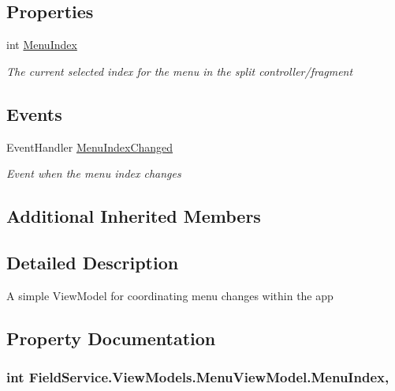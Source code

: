 \subsection*{Properties}
\begin{DoxyCompactItemize}
\item 
int \hyperlink{class_field_service_1_1_view_models_1_1_menu_view_model_a8dbf73651cef54e51cfbd2b8707e7f65}{Menu\+Index}
\begin{DoxyCompactList}\small\item\em The current selected index for the menu in the split controller/fragment \end{DoxyCompactList}\end{DoxyCompactItemize}
\subsection*{Events}
\begin{DoxyCompactItemize}
\item 
Event\+Handler \hyperlink{class_field_service_1_1_view_models_1_1_menu_view_model_a8f7c18e4878f8977e177a96e26e3b08e}{Menu\+Index\+Changed}
\begin{DoxyCompactList}\small\item\em Event when the menu index changes \end{DoxyCompactList}\end{DoxyCompactItemize}
\subsection*{Additional Inherited Members}


\subsection{Detailed Description}
A simple View\+Model for coordinating menu changes within the app 



\subsection{Property Documentation}
\hypertarget{class_field_service_1_1_view_models_1_1_menu_view_model_a8dbf73651cef54e51cfbd2b8707e7f65}{
\subsubsection[{Menu\+Index}]{\setlength{\rightskip}{0pt plus 5cm}int Field\+Service.\+View\+Models.\+Menu\+View\+Model.\+Menu\+Index\hspace{0.3cm}{\ttfamily [get]}, {\ttfamily [set]}}}\label{class_field_service_1_1_view_models_1_1_menu_view_model_a8dbf73651cef54e51cfbd2b8707e7f65}


